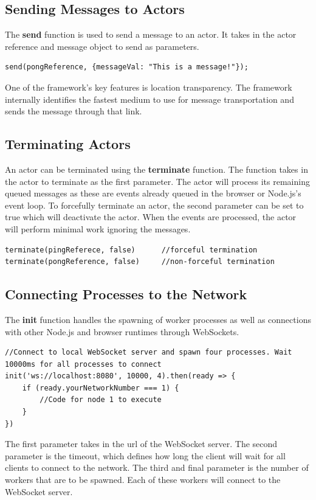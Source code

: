 \documentclass[12pt, a4paper]{report}
\theoremstyle{definition}
\theoremstyle{definition}%
\theoremstyle{definition}%
\theoremstyle{definition}%
\theoremstyle{definition}%
\theoremstyle{definition}%
\begin{document}
\subsection{Sending Messages to Actors}
The \textbf{send} function is used to send a message to an actor. It takes in the actor reference and message object to send as parameters.
\begin{lstlisting}
send(pongReference, {messageVal: "This is a message!"});
\end{lstlisting}
One of the framework's key features is location transparency. The framework internally identifies the fastest medium to use for message transportation and sends the message through that link.
\subsection{Terminating Actors}
An actor can be terminated using the \textbf{terminate} function. The function takes in the actor to terminate as the first parameter. The actor will process its remaining queued messages as these are events already queued in the browser or Node.js's event loop. To forcefully terminate an actor, the second parameter can be set to true which will deactivate the actor. When the events are processed, the actor will perform minimal work ignoring the messages.
\begin{lstlisting}
terminate(pingReferece, false)      //forceful termination
terminate(pongReference, false)     //non-forceful termination
\end{lstlisting}
\subsection{Connecting Processes to the Network}
The \textbf{init} function handles the spawning of worker processes as well as connections with other Node.js and browser runtimes through WebSockets.
\begin{lstlisting}
//Connect to local WebSocket server and spawn four processes. Wait 10000ms for all processes to connect
init('ws://localhost:8080', 10000, 4).then(ready => {
    if (ready.yourNetworkNumber === 1) {
        //Code for node 1 to execute
    }
})
\end{lstlisting}
 
The first parameter takes in the url of the WebSocket server. The second parameter is the timeout, which defines how long the client will wait for all clients to connect to the network. The third and final parameter is the number of workers that are to be spawned. Each of these workers will connect to the WebSocket server.
\end{document}
